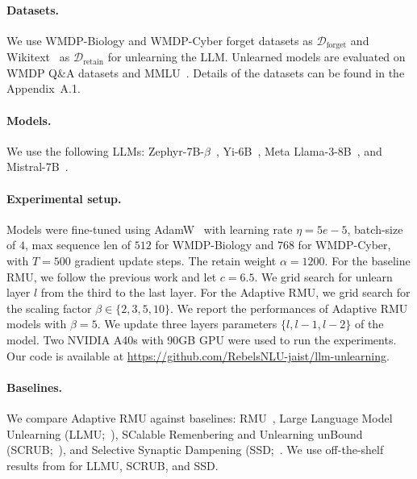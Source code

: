 \documentclass[letterpaper]{article} %
\begin{document}
\paragraph{Datasets.} We use WMDP-Biology and WMDP-Cyber forget datasets as $\mathcal{D}_\text{forget}$ and Wikitext~\cite{wikitext} as $\mathcal{D}_\text{retain}$ for unlearning the LLM. Unlearned models are evaluated on WMDP Q\&A datasets and MMLU~\cite{mmlu}. Details of the datasets can be found in the Appendix~A.1. 
\paragraph{Models.} We use the following LLMs: Zephyr-7B-$\beta$~\cite{tunstall2023zephyr}, Yi-6B~\cite{young2024yi}, Meta Llama-3-8B~\cite{meta2024introducing}, and Mistral-7B~\cite{jiang2023mistral}.

\paragraph{Experimental setup.} Models were fine-tuned using AdamW~\cite{adamw} with learning rate $\eta = 5e-5$, batch-size of $4$, max sequence len of $512$ for WMDP-Biology and $768$ for WMDP-Cyber, with $T=500$ gradient update steps. 
The retain weight $\alpha=1200$. 
For the baseline RMU, we follow the previous work and let $c=6.5$. 
We grid search for unlearn layer $l$ from the third to the last layer. For the Adaptive RMU, we grid search for the scaling factor $\beta \in \{2, 3, 5, 10\}$. We report the performances of Adaptive RMU models with $\beta=5$.
We update three layers parameters $\{l, l-1, l-2\}$ of the model. 
Two NVIDIA A40s with 90GB GPU were used to run the experiments. Our code is available at \url{https://github.com/RebelsNLU-jaist/llm-unlearning}.

\paragraph{Baselines.} We compare Adaptive RMU against baselines: RMU~\cite{wmdp}, Large Language Model Unlearning (LLMU;~\citet{llmu}), SCalable Remenbering and Unlearning unBound (SCRUB;~\citet{kurmanji2023towards}), and Selective Synaptic Dampening (SSD;~\citet{ssd}. We use off-the-shelf results from \citet{wmdp} for LLMU, SCRUB, and SSD.
\end{document}
